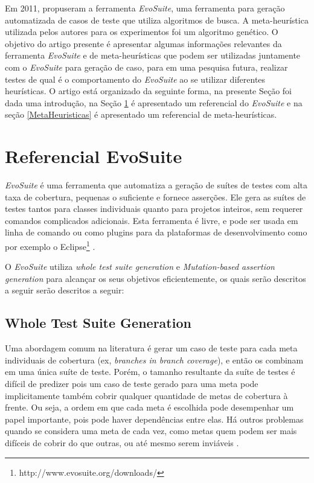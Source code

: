 \documentclass[conference]{IEEEtran}
\begin{document}
Em 2011, \cite{fraser2011evosuite} propuseram a ferramenta \emph{EvoSuite}, uma ferramenta para geração automatizada de casos de teste que utiliza algoritmos de busca. A meta-heurística utilizada pelos autores para os experimentos foi um algoritmo genético. O objetivo do artigo presente é apresentar algumas informações relevantes da ferramenta \emph{EvoSuite} e de meta-heurísticas que podem ser utilizadas juntamente com o \emph{EvoSuite} para geração de caso, para em uma pesquisa futura, realizar testes de qual é o comportamento do \emph{EvoSuite} ao se utilizar diferentes heurísticas. O artigo está organizado da seguinte forma, na presente Seção foi dada uma introdução, na Seção \ref{ReferencialEvoSuite} é apresentado um referencial do \emph{EvoSuite} e na seção \ref{MetaHeuristicas} é apresentado um referencial de meta-heurísticas.


\section{Referencial EvoSuite} \label{ReferencialEvoSuite}

\textit{EvoSuite} é uma ferramenta que automatiza a geração de suítes de testes com alta taxa de cobertura, pequenas o suficiente e fornece asserções. Ele gera as suítes de testes tantos para classes individuais quanto para projetos inteiros, sem requerer comandos complicados adicionais. Esta ferramenta é livre, e pode ser usada em linha de comando ou como  plugins para da plataformas de desenvolvimento como por exemplo o Eclipse\footnote{http://www.evosuite.org/downloads/} \cite{fraser2011evosuite}.

O \textit{EvoSuite} utiliza \textit{whole test suite generation} e \textit{Mutation-based assertion generation} para alcançar os seus objetivos eficientemente, os quais serão descritos a seguir serão descritos a seguir:

\subsection{Whole Test Suite Generation}

Uma abordagem comum na literatura é gerar um caso de teste para cada meta individuais de cobertura (ex, \textit{branches in branch coverage}), e então os combinam em uma única suíte de teste. Porém, o tamanho resultante da suíte de testes é difícil de predizer pois um caso de teste gerado para uma meta pode implicitamente também cobrir qualquer quantidade de metas de cobertura à frente. Ou seja, a ordem em que cada meta é escolhida pode desempenhar um papel importante, pois pode haver dependências entre elas. Há outros problemas quando se considera uma meta de cada vez, como metas quem podem ser mais difíceis de cobrir do que outras, ou até mesmo serem inviáveis \cite{fraser2013whole}.
\end{document}
